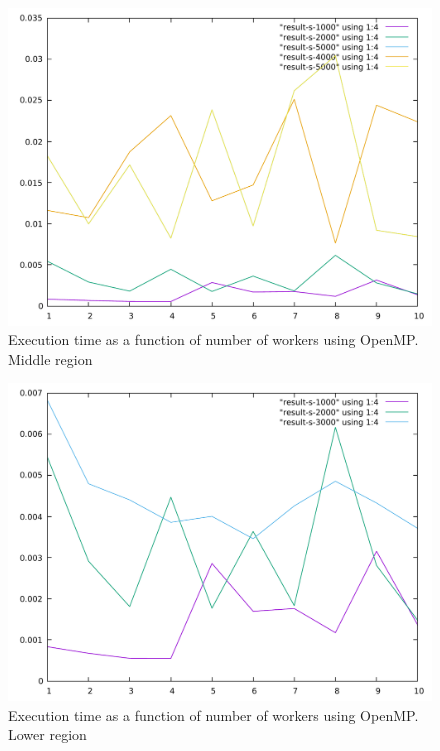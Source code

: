 \documentclass[journal]{IEEEtran}
\begin{document}
\begin{figure}[h]
\centering
\includegraphics[width=\textwidth]{compare-midrange}
\caption{Execution time as a function of number of workers using OpenMP. Middle region}
\label{fig:mid}
\end{figure}

\begin{figure}[h]
\centering
\includegraphics[width=\textwidth]{compare-lowrange}
\caption{Execution time as a function of number of workers using OpenMP. Lower region}
\label{fig:low}
\end{figure}
\end{document}

